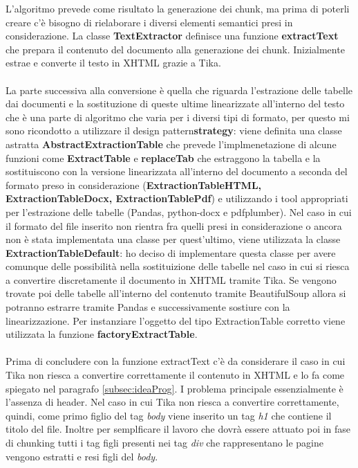 \noindent L'algoritmo prevede come risultato la generazione dei chunk, ma prima di poterli creare c'è bisogno di rielaborare i diversi elementi semantici presi in considerazione.
La classe \textbf{TextExtractor} definisce una funzione \textbf{extractText} che prepara il contenuto del documento alla generazione dei chunk. Inizialmente estrae e converte il testo in XHTML grazie a Tika.
\\\\La parte successiva alla conversione è quella che riguarda l'estrazione delle tabelle dai documenti e la sostituzione di queste ultime linearizzate all'interno del testo che è una parte di algoritmo che varia per i diversi tipi di formato, per questo mi sono ricondotto a utilizzare 
il \gls{design pattern}\glsfirstoccur \textbf{\gls{strategy}}\glsfirstoccur: viene definita una classe astratta \textbf{AbstractExtractionTable} che prevede l'implmenetazione di alcune funzioni come \textbf{ExtractTable} e \textbf{replaceTab} che estraggono la tabella e la sostituiscono con la versione linearizzata all'interno del documento
a seconda del formato preso in considerazione (\textbf{ExtractionTableHTML, ExtractionTableDocx, ExtractionTablePdf}) e utilizzando i tool appropriati per l'estrazione delle tabelle (Pandas, python-docx e pdfplumber).
Nel caso in cui il formato del file inserito non rientra fra quelli presi in considerazione o ancora non è stata implementata una classe per quest'ultimo, viene utilizzata la classe \textbf{ExtractionTableDefault}: ho deciso di implementare questa classe per avere comunque delle possibilità nella sostituizione delle tabelle nel caso in cui si riesca a convertire discretamente il documento in XHTML tramite Tika.
Se vengono trovate poi delle tabelle all'interno del contenuto tramite BeautifulSoup allora si potranno estrarre tramite Pandas e successivamente sostiure con la linearizzazione.
Per instanziare l'oggetto del tipo ExtractionTable corretto viene utilizzata la funzione \textbf{factoryExtractTable}. 
\\\\Prima di concludere con la funzione extractText c'è da considerare il caso in cui Tika non riesca a convertire correttamente il contenuto in XHTML e lo fa come spiegato nel paragrafo \ref{subsec:ideaProg}. I problema principale essenzialmente è l'assenza di header.
Nel caso in cui Tika non riesca a convertire correttamente, quindi, come primo figlio del tag \emph{body} viene inserito un tag \emph{h1} che contiene il titolo del file.
Inoltre per semplficare il lavoro che dovrà essere attuato poi in fase di chunking tutti i tag figli presenti nei tag \emph{div} che rappresentano le pagine vengono estratti e resi figli del \emph{body}.
